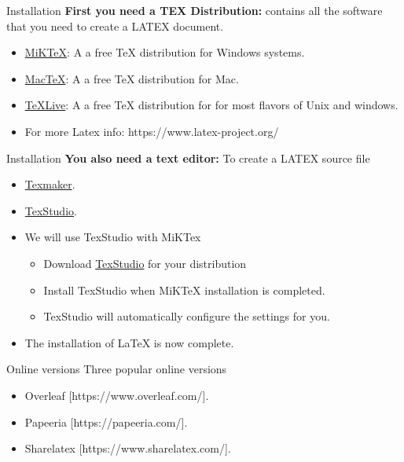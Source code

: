 \documentclass{beamer}
\begin{document}
\begin{darkframes}
   
   
   \begin{frame}[<+->]{Installation}
   	\textbf{First you need a TEX Distribution:} contains all the software that you need to create a LATEX document.
   	\begin{itemize}
   		\item \href{http://miktex.org/}{MiKTeX}: A a free TeX distribution for Windows systems.
   		\item \href{http://www.tug.org/mactex/}{MacTeX}: A a free TeX distribution for Mac.
   		\item \href{https://www.tug.org/texlive/}{TeXLive}: A a free TeX distribution for for most flavors of Unix and windows.
   		\item  For more Latex info: https://www.latex-project.org/
   	\end{itemize}
   	
   \end{frame}
   
   
   \begin{frame}[<+->]{Installation}
   	\textbf{You also need a text editor:} To create a LATEX source file
   	\begin{itemize}
   		\item \href{http://www.xm1math.net/texmaker/}{Texmaker}.
   		\item \href{http://www.texstudio.org/}{TexStudio}.
   		\item We will use TexStudio with MiKTex
   		\begin{itemize}
   			\item Download \href{http://www.texstudio.org/}{TexStudio} for your distribution
   			\item Install TexStudio when MiKTeX installation is completed.
   			\item TexStudio will automatically configure the settings for you.
   		\end{itemize}
   		\item The installation of LaTeX is now complete.
   	\end{itemize}
   \end{frame}
   
   \begin{frame}[<+->]{Online versions}
   	Three popular online versions
   	\begin{itemize}
   		\item Overleaf [https://www.overleaf.com/].
   		\item Papeeria [https://papeeria.com/].
   		\item Sharelatex [https://www.sharelatex.com/].
   	\end{itemize}
   \end{frame}


\end{darkframes}
\end{document}
